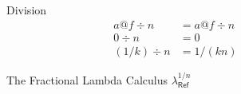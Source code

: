 \documentclass[acmsmall]{acmart}
\makeatletter
\newcommand{\ba}{\begin{array}}
\newcommand{\ea}{\end{array}}
\newenvironment{syntax}{\[\ba{l@{\;\;}lcl}}{\ea\]}
\newcommand{\dotspace}{.\,}
\newcommand{\lam}[1]{\lambda #1 \dotspace}
\newcommand{\app}{\,}
\newcommand{\unit}{\mathsf{unit}}
\newcommand{\addr}[2]{#1 @ #2}
\newcommand{\LET}[3]{\mathsf{let}\,#1 = #2 \,\mathsf{in}\,#3}
\makeatother
\begin{document}
\begin{figure}
  

Division
\begin{align*}
  \addr{a}{f} \div n &= \addr{a}{f \div n} \\[2ex]
  0 \div n &= 0 \\
  (1/k) \div n &= 1/(kn)
  \end{align*}
  
  \caption{The Fractional Lambda Calculus $\lambda^{1/n}_{\mathsf{Ref}}$}
  \label{fig:lambda-frac}
\end{figure}





\end{document}
